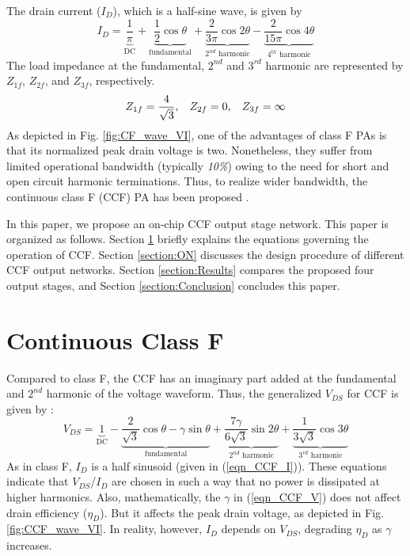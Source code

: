 \documentclass[conference]{IEEEtran}
\begin{document}
The drain current ($I_{D}$), which is a half-sine wave, is given by
\begin{equation}
I_{D}=\underbrace{\frac{1}{\pi}}_{\text{DC}}+\underbrace{\frac{1}{2} \cos \theta}_{\text{fundamental}}+\underbrace{\frac{2}{3 \pi} \cos 2 \theta}_{\text{$2^{nd}$ harmonic}}-\underbrace{\frac{2}{15 \pi} \cos 4 \theta}_{\text{$4^{th}$ harmonic}}
\label{eqn_CCF_I}
\end{equation}
The load impedance at the fundamental, $2^{nd}$ and $3^{rd}$ harmonic are represented by $Z_{1f}$, $Z_{2f}$, and $Z_{3f}$, respectively.
\begin{equation}
\begin{aligned}
Z_{1f}=\frac{4}{\sqrt{3}}, \hspace{3mm}
Z_{2f}=0, \hspace{3mm}
Z_{3f}=\infty
\end{aligned}
\label{eqn_CF}
\end{equation}
As depicted in Fig. \ref{fig:CF_wave_VI},  one of the advantages of class F PAs is that its normalized peak drain voltage is two. Nonetheless, they suffer from limited operational bandwidth (typically \textit{10\%}) owing to the need for short and open circuit harmonic terminations. Thus, to realize wider bandwidth, the continuous class F (CCF) PA has been proposed \cite{CCF_reason}.

In this paper, we propose an on-chip CCF output stage network. This paper is organized as follows. Section \ref{section:CCF} briefly explains the equations governing the operation of CCF. Section \ref{section:ON} discusses the design procedure of different CCF output networks. Section \ref{section:Results} compares the proposed four output stages, and Section \ref{section:Conclusion} concludes this paper.

\section{Continuous Class F}
\label{section:CCF}
\vspace{-0.05in}
Compared to class F, the CCF has an imaginary part added at the fundamental and $2^{nd}$ harmonic of the voltage waveform. Thus, the generalized $V_{DS}$ for CCF is given by \cite{ECCF_Carrubba}:
\begin{equation}
V_{DS}=\underbrace{1}_{\text{DC}}-\underbrace{\frac{2}{\sqrt{3}} \cos \theta-\gamma \sin \theta}_{\text{fundamental}}+\underbrace{\frac{7 \gamma}{6 \sqrt{3}} \sin 2 \theta}_{\text{$2^{nd}$ harmonic}}+\underbrace{\frac{1}{3 \sqrt{3}} \cos 3 \theta}_{\text{$3^{rd}$ harmonic}}
\label{eqn_CCF_V}
\end{equation}
As in class F, $I_{D}$ is a half sinusoid (given in (\ref{eqn_CCF_I})). These equations indicate that $V_{DS}$/$I_{D}$ are chosen in such a way that no power is dissipated at higher harmonics. Also, mathematically, the $\gamma$ in (\ref{eqn_CCF_V}) does not affect drain efficiency ($\eta_D$). But it affects the peak drain voltage, as depicted in Fig. \ref{fig:CCF_wave_VI}. In reality, however, $I_{D}$ depends on $V_{DS}$, degrading $\eta_D$ as $\gamma$ increases.
\end{document}
